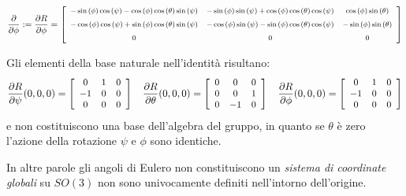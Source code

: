 \documentclass[11pt]{report}
\theoremstyle{plain}
\theoremstyle{definition}
\theoremstyle{remark}
\begin{document}
\begin{flushleft}
\begin{displaymath}\footnotesize
\dfrac{\partial}{\partial \phi} := \dfrac{\partial R}{\partial \phi} = \left[ \begin {array}{ccc} -\sin \left( \phi \right) \cos \left( \psi \right) -\cos \left( \phi \right) \cos \left( \theta \right) \sin \left( \psi \right) &-\sin \left( \phi \right) \sin \left( \psi \right) +\cos \left( \phi \right) \cos \left( \theta \right) \cos \left( \psi \right) &\cos \left( \phi \right) \sin \left( \theta \right) \\ \noalign{\medskip}-\cos \left( \phi \right) \cos \left( \psi \right) +\sin \left( \phi \right) \cos \left( \theta \right) \sin \left( \psi \right) &-\cos \left( \phi \right) \sin \left( \psi \right) -\sin \left( \phi \right) \cos \left( \theta \right) \cos \left( \psi \right) &-\sin \left( \phi \right) \sin \left( \theta \right) \\ \noalign{\medskip}0&0&0\end {array} \right]
\end{displaymath}

\end{flushleft}


Gli elementi della base naturale nell'identità risultano:
\begin{displaymath}
\small
\dfrac{\partial R}{\partial \psi} (0,0,0) = \left[ \begin{array}{ccc}
0 & 1 &0  \\
-1 & 0 & 0 \\
0 & 0 & 0 \\
\end{array} \right]
\quad
\dfrac{\partial R}{\partial \theta} (0,0,0) = \left[ \begin{array}{ccc}
0 & 0 & 0  \\
0 & 0 & 1 \\
0 & -1 & 0 \\
\end{array} \right]
\quad
\dfrac{\partial R}{\partial \phi} (0,0,0) = \left[ \begin{array}{ccc}
0 & 1 & 0  \\
-1 & 0 & 0 \\
0 & 0 & 0 \\
\end{array} \right]
\end{displaymath}
e non costituiscono una base dell'algebra del gruppo, in quanto se $\theta$ è zero l'azione della rotazione $\psi$ e $\phi$ sono identiche.

In altre parole gli angoli di Eulero non constituiscono un \emph{sistema di coordinate globali} su $SO(3)$ non sono univocamente definiti nell'intorno dell'origine.
\end{document}
